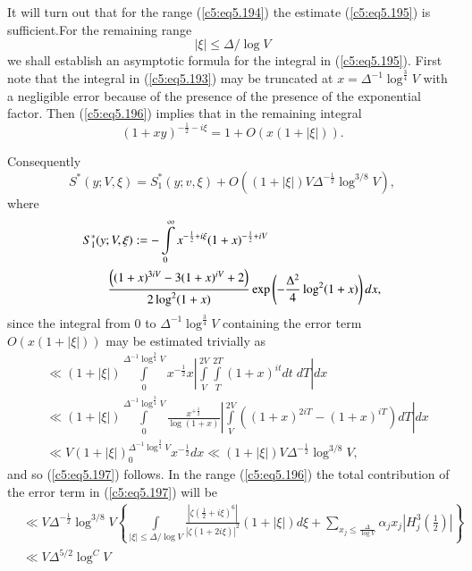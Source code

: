 It will turn out that for the range (\ref{c5:eq5.194}) the estimate
(\ref{c5:eq5.195}) is sufficient.\pageoriginale For the remaining
range 
\begin{equation}
|\xi| \leq \Delta / \log V\label{c5:eq5.196}
\end{equation}
we shall establish an asymptotic formula for the integral in
(\ref{c5:eq5.195}). First note that the integral in (\ref{c5:eq5.193})
may be truncated at $x =\Delta^{-1} \log^{\frac{3}{4}} V$ with a
negligible error because of the presence of the presence of the
exponential factor. Then (\ref{c5:eq5.196}) implies that in the
remaining integral 
$$
(1+xy)^{-\frac{1}{2} - i \xi} = 1+ O (x(1+ |\xi|)).
$$

Consequently
\begin{equation}
S^* (y;V,\xi) = S^*_1(y;v,\xi) + O \left((1+|\xi|) V \Delta^{-\frac{1}{2}}
\log^{3/8} V\right), \label{c5:eq5.197}
\end{equation}
where
\begin{align}
& S^*_1 (y;V,\xi) : = - \int\limits^\infty_0 x^{-\frac{1}{2} + i \xi}
  (1+x)^{-\frac{1}{2} + iV}\label{c5:eq5.198} \\ 
& \qquad  \frac{\left((1+x)^{3iV} - 3 (1+x)^{iV} + 2\right)}{2 \log^2
    (1+x)} \exp \left(-\frac{\Delta^2}{4} \log^2 (1+x) \right)
  dx,\notag   
\end{align}
since the integral from 0 to $\Delta^{-1} \log^{\frac{3}{4}} V$
containing the error term $O (x (1+ |\xi|))$ may be estimated
trivially as  
\begin{align*}
& \ll (1+|\xi|) \int\limits^{\Delta^{-1} \log^{\frac{3}{4}} V}_0
  x^{-\frac{1}{2}} x \left|\int\limits^{2V}_V \int\limits^{2T}_T
  (1+x)^{it} dt \; d T \right| dx\\ 
& \ll (1+|\xi|) \int\limits^{\Delta^{-1} \log^{\frac{3}{4}} V}_0
  \frac{x^{+\frac{1}{2}}}{\log(1+x)} \left| \int\limits^{2V}_V
  \left((1+x)^{2iT} - (1+x)^{iT}\right) dT \right| dx\\ 
& \ll V (1+|\xi|)^{\Delta^{-1} \log^{\frac{3}{4}} V}_0
  x^{-\frac{1}{2}} dx \ll (1+ |\xi|) V\Delta^{-\frac{1}{2}} \log^{3/8}
  V, 
\end{align*}
and so (\ref{c5:eq5.197}) follows. In the range (\ref{c5:eq5.196}) the
total contribution of the error term in (\ref{c5:eq5.197}) will be  
{\fontsize{10}{12}\selectfont
\begin{align*}
&\ll V\Delta^{-\frac{1}{2}} \log^{3/8} V \left\{ \int\limits_{|\xi|
  \leq \Delta / \log V} \frac{|\zeta (\frac{1}{2} + i
  \xi)^6|}{|\zeta(1+2i \xi)|^2} (1+ |\xi|) d \xi + \sum\limits_{x_j
  \leq \frac{\Delta}{\log V}} \alpha_j x_j \left|H^3_j \left(\frac{1}{2}
\right)\right| \right\} \\ 
&\ll V \Delta^{5/2} \log^C V
\end{align*}}
